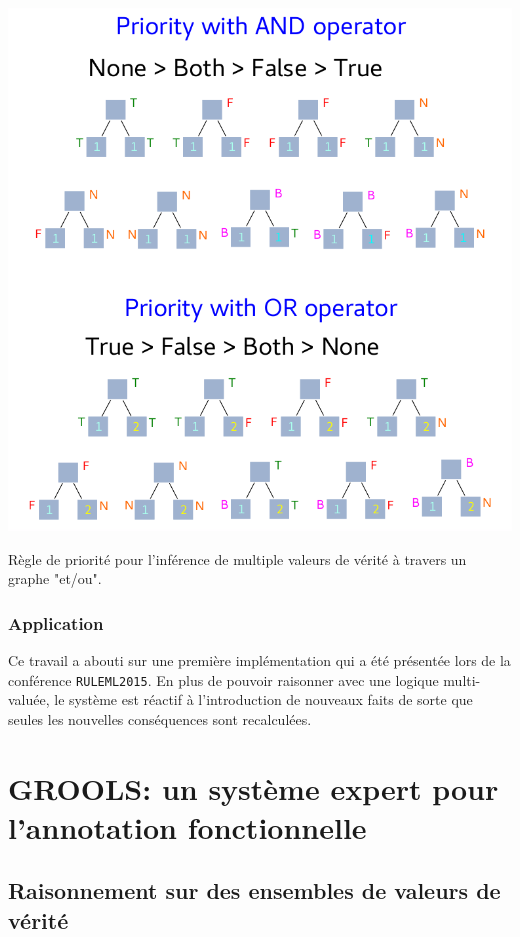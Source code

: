 \begin{refsegment}
\begin{shadedfigure}[H]
    \centering
    \includegraphics[width=\textwidth]{img/four_values_priorities_rules.pdf}
    \caption{ Règle de priorité pour l'inférence de multiple valeurs de vérité à travers un graphe "et/ou". }
    \label{fig:four_truth_values}
\end{shadedfigure}


\subsection{Application}
Ce travail a abouti sur une première implémentation qui a été présentée lors de la conférence \texttt{RULEML2015}. En plus de pouvoir raisonner avec une logique multi-valuée, le système est réactif à l'introduction de nouveaux faits de sorte que seules les nouvelles conséquences sont recalculées.



\chapter{GROOLS: un système expert pour l'annotation fonctionnelle}

\section{Raisonnement sur des ensembles de valeurs de vérité}


\end{refsegment}
